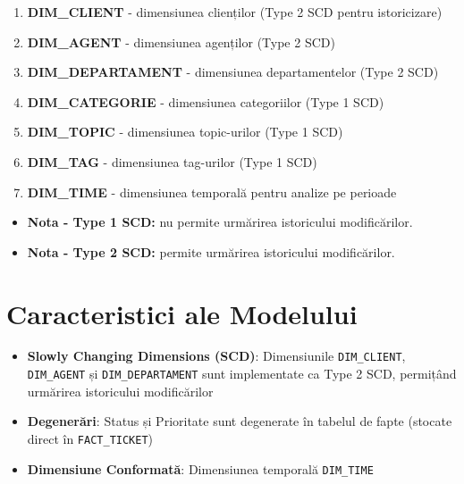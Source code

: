 \begin{enumerate}
    \item \textbf{DIM\_CLIENT} - dimensiunea clienților (Type 2 SCD pentru istoricizare)
    \item \textbf{DIM\_AGENT} - dimensiunea agenților (Type 2 SCD)
    \item \textbf{DIM\_DEPARTAMENT} - dimensiunea departamentelor (Type 2 SCD)
    \item \textbf{DIM\_CATEGORIE} - dimensiunea categoriilor (Type 1 SCD)
    \item \textbf{DIM\_TOPIC} - dimensiunea topic-urilor (Type 1 SCD)
    \item \textbf{DIM\_TAG} - dimensiunea tag-urilor (Type 1 SCD)
    \item \textbf{DIM\_TIME} - dimensiunea temporală pentru analize pe perioade
\end{enumerate}

\begin{itemize}
    \item \textbf{Nota - Type 1 SCD:} nu permite urmărirea istoricului modificărilor.
    \item \textbf{Nota - Type 2 SCD:} permite urmărirea istoricului modificărilor.
\end{itemize}

\section{Caracteristici ale Modelului}

\begin{itemize}
    \item \textbf{Slowly Changing Dimensions (SCD)}: Dimensiunile \texttt{DIM\_CLIENT}, \texttt{DIM\_AGENT} și \texttt{DIM\_DEPARTAMENT} sunt implementate ca Type 2 SCD, permițând urmărirea istoricului modificărilor
    \item \textbf{Degenerări}: Status și Prioritate sunt degenerate în tabelul de fapte (stocate direct în \texttt{FACT\_TICKET})
    \item \textbf{Dimensiune Conformată}: Dimensiunea temporală \texttt{DIM\_TIME}
\end{itemize}
